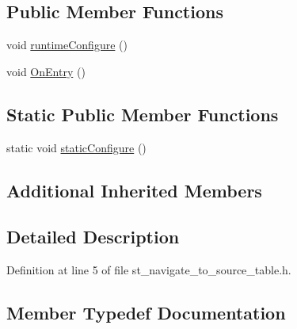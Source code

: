 \subsection*{Public Member Functions}
\begin{DoxyCompactItemize}
\item 
void \hyperlink{structsm__moveit__4_1_1StNavigateToSourceTable_a532b64eb7ea6938d22c712e29ecf0ac9}{runtime\+Configure} ()
\item 
void \hyperlink{structsm__moveit__4_1_1StNavigateToSourceTable_aa90111c5a22ed67dfe20024a7b135837}{On\+Entry} ()
\end{DoxyCompactItemize}
\subsection*{Static Public Member Functions}
\begin{DoxyCompactItemize}
\item 
static void \hyperlink{structsm__moveit__4_1_1StNavigateToSourceTable_a10d9b17cf7d5450760c13552eb9de0b5}{static\+Configure} ()
\end{DoxyCompactItemize}
\subsection*{Additional Inherited Members}


\subsection{Detailed Description}


Definition at line 5 of file st\+\_\+navigate\+\_\+to\+\_\+source\+\_\+table.\+h.



\subsection{Member Typedef Documentation}
\mbox{\label{structsm__moveit__4_1_1StNavigateToSourceTable_a83fbcaf1bf1abdbcac936c6c3201893d}} 
